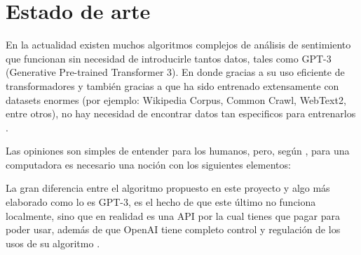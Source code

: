 \documentclass[a4]{sciposter}
\begin{document}
\begin{multicols}{2}
\begin{figure}
\end{figure}

\section{Estado de arte}

En la actualidad existen muchos algoritmos complejos de análisis de sentimiento que funcionan sin necesidad de introducirle tantos datos, tales como GPT-3 (Generative Pre-trained Transformer 3). En donde gracias a su uso eficiente de transformadores y también gracias a que ha sido entrenado extensamente con datasets enormes (por ejemplo: Wikipedia Corpus, Common Crawl, WebText2, entre otros), no hay necesidad de encontrar datos tan especificos para entrenarlos \citep{gpt3}.

Las opiniones son simples de entender para los humanos, pero, según \citet{liu}, para una computadora es necesario una noción con los siguientes elementos:



La gran diferencia entre el algoritmo propuesto en este proyecto y algo más elaborado como lo es GPT-3, es el hecho de que este último no funciona localmente, sino que en realidad es una API por la cual tienes que pagar para poder usar, además de que OpenAI tiene completo control y regulación de los usos de su algoritmo \citep{openai}. 


\end{multicols}
\end{document}
